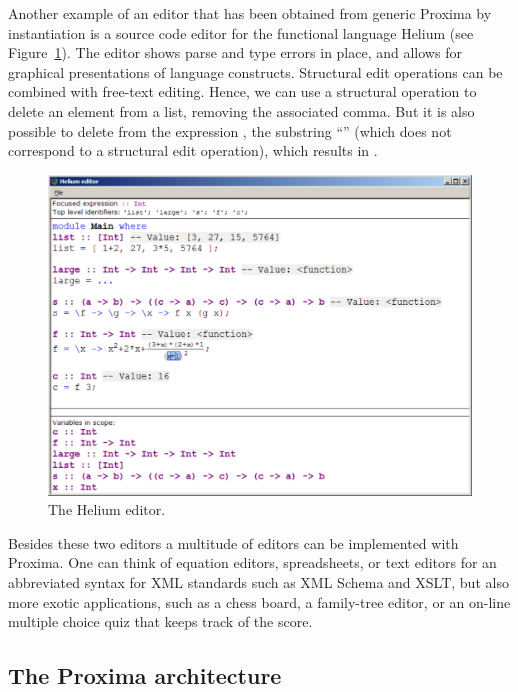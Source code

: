\documentclass[10pt]{article}
\begin{document}
Another example of an editor that has been obtained from generic Proxima by instantiation is a source code editor for the functional language Helium (see Figure~\ref{fig:heliumEditor}). The editor shows parse and type errors in place, and allows for graphical presentations of language constructs. Structural edit operations can be combined with free-text editing. Hence, we can use a structural operation to delete an element from a list, removing the associated comma. But it is also possible to delete from the expression \p{[ 1+2, 3]},  the substring ``'' (which does not correspond to a structural edit operation), which results in \p{[ 13 ]}. 


\begin{figure}
\includegraphics[width=12cm]{images/heliumMainWindow}
\caption{The Helium editor.}
\label{fig:heliumEditor}
\end{figure}

Besides these two editors a multitude of editors can be implemented with Proxima. One can think of equation editors, spreadsheets, or text editors for an abbreviated syntax for XML standards such as XML Schema and XSLT, but also more exotic applications, such as a chess board, a family-tree editor, or an on-line multiple choice quiz that keeps track of the score.


\subsection{The Proxima architecture}
\end{document}
